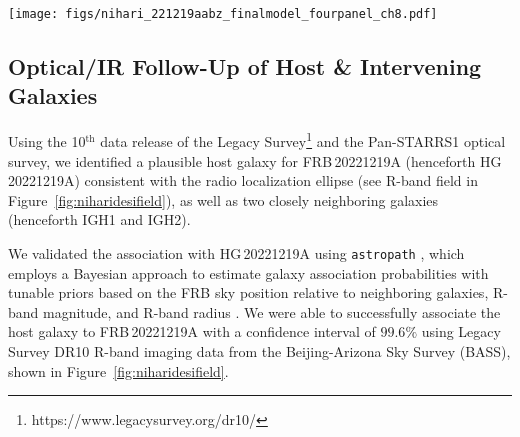 \documentclass[twocolumn, linenumbers, tra]{aastex631}
\newcommand{\nihari}{FRB\,20221219A } %
\begin{document}
\begin{figure*}
  \centering
  \hspace{-0cm}
  \texttt{[image: figs/nihari\_221219aabz\_finalmodel\_fourpanel\_ch8.pdf]}
  \caption{{A 2D fit of the pulse model defined in Eq.~\ref{eq:expgauss} to \nihari. \textit{Panel A:} The dynamic (time-frequency) spectrum downsampled in time by a factor of 8 ($\Delta t = 0.262\ \mathrm{ms}$) and in frequency by a factor of 768 to form 8 channels across the band ($\Delta \nu = 23.438\ \mathrm{MHz}$). To better visualize the burst in the dynamic spectrum, we smoothed the data in time using a 1D Savitzky--Golay filter with a 31 bin ($8.13\ \mathrm{ms}$) smoothing kernel of polynomial order $k=3$, indicated by the hatched rectangle. The timeseries in the upper sub-panel is downsampled but not smoothed, showing both the total intensity ($\mathrm{I_{data}}$, black) and linearly polarized signal ($\mathrm{L_{data}}$, magenta). \textit{Panel B: } The best-fit model dynamic spectrum, for which the best-fit parameters can be found in Table~\ref{tab:nihariprops} and full posteriors are shown in Figure\ \ref{fig:corner}. \textit{Panel C: } The sum of the model dynamic spectrum with randomly sampled noise obeying a log-normal distribution, as characterized for each channel in the off-pulse data. \textit{Panel D: } The residual dynamic spectrum, here obtained by subtracting the model spectrum with added noise from the data.}}
  \label{fig:nihariwfall}
\end{figure*}

\subsection{Optical/IR Follow-Up of Host \& Intervening Galaxies}\label{sec:hostID}

Using the 10$^{\mathrm{th}}$ data release of the Legacy Survey\footnote{https://www.legacysurvey.org/dr10/} \citep[DR10 R-band image;][]{Dey2019} and the Pan-STARRS1 \citep[PS1;][]{Chambers2016} optical survey, we identified a plausible host galaxy for \nihari (henceforth HG\,20221219A) consistent with the radio localization ellipse (see R-band field in Figure\ \ref{fig:niharidesifield}), as well as two closely neighboring galaxies (henceforth IGH1 and IGH2).

We validated the association with HG\,20221219A using \texttt{astropath} \citep{Aggarwal2021}, which employs a Bayesian approach to estimate galaxy association probabilities with tunable priors based on the FRB sky position relative to neighboring galaxies, R-band magnitude, and R-band radius \citep[see the SED fit in Figure\ \ref{fig:niharised} and][for details regarding host galaxy association methods]{Sharma2023, Law2023}. We were able to successfully associate the host galaxy to \nihari with a confidence interval of $99.6\%$ using Legacy Survey DR10 R-band imaging data from the Beijing-Arizona Sky Survey (BASS), shown in Figure\ \ref{fig:niharidesifield}. 
\end{document}
